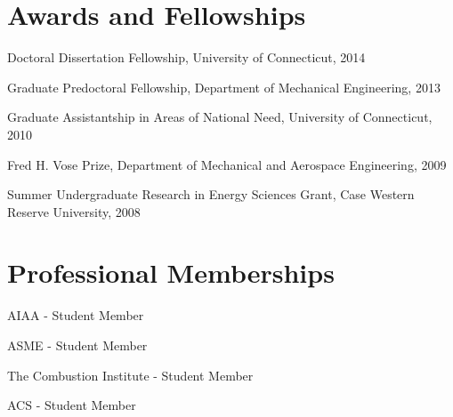 \vspace{0.5em}

\section{{\sectionfont Awards and Fellowships}}

Doctoral Dissertation Fellowship, University of Connecticut, 2014

Graduate Predoctoral Fellowship, Department of Mechanical
Engineering, 2013

Graduate Assistantship in Areas of National
Need, University of Connecticut, 2010

Fred H. Vose Prize, Department of Mechanical and
Aerospace Engineering, 2009

Summer Undergraduate Research in Energy Sciences
Grant, Case Western Reserve University, 2008

\section{{\sectionfont Professional Memberships}}
AIAA - Student Member

ASME - Student Member

The Combustion Institute - Student Member

ACS - Student Member



